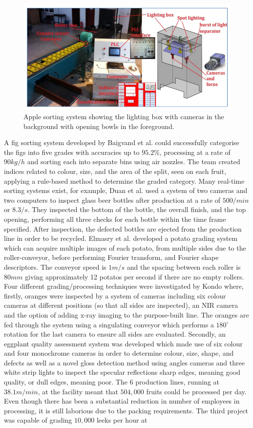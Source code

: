 \documentclass[fleqn,twoside,12pt]{report}
\begin{document}
\begin{figure}[h]
	\centering
	\includegraphics[width=0.7\linewidth]{apple_system.png}
	\caption{Apple sorting system showing the lighting box with cameras in the background with opening bowls in the foreground.}
	\label{fig:apple_system}
\end{figure}%

A fig sorting system developed by Baigvand et al.\cite{baigvand} could successfully categorise the figs into five grades with accuracies up to $95.2\%$, processing at a rate of $90kg/h$ and sorting each into separate bins using air nozzles. The team created indices related to colour, size, and the area of the split, seen on each fruit, applying a rule-based method to determine the graded category. Many real-time sorting systems exist, for example, Duan et al.\cite{duan} used a system of two cameras and two computers to inspect glass beer bottles after production at a rate of $500/min$ or $8.3/s$. They inspected the bottom of the bottle, the overall finish, and the top opening, performing all three checks for each bottle within the time frame specified. After inspection, the defected bottles are ejected from the production line in order to be recycled. Elmasry et al.\cite{elmasry1} developed a potato grading system which can acquire multiple images of each potato, from multiple sides due to the roller-conveyor, before performing Fourier transform, and Fourier shape descriptors. The conveyor speed is $1m/s$ and the spacing between each roller is $80mm$ giving approximately 12 potatos per second if there are no empty rollers. Four different grading/processing techniques were investigated by Kondo \cite{kondo} where, firstly, oranges were inspected by a system of cameras including six colour cameras at different positions (so that all sides are inspected), an NIR camera and the option of adding x-ray imaging to the purpose-built line. The oranges are fed through the system using a singulating conveyor which performs a $180^{\circ}$ rotation for the last camera to ensure all sides are evaluated. Secondly, an eggplant quality assessment system was developed which made use of six colour and four monochrome cameras in order to determine colour, size, shape, and defects as well as a novel gloss detection method using angles cameras and three white strip lights to inspect the specular reflections sharp edges, meaning good quality, or dull edges, meaning poor. The 6 production lines, running at $38.1m/min$, at the facility meant that $504,000$ fruits could be processed per day. Even though there has been a substantial reduction in number of employees in processing, it is still laborious due to the packing requirements. The third project was capable of grading $10,000$ leeks per hour at 
\end{document}
